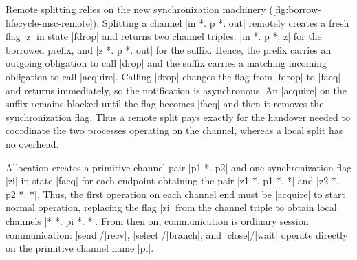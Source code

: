 Remote splitting relies on the new synchronization machinery
(\cref{fig:borrow-lifecycle-msc-remote}). Splitting a channel
|in *. p *. out| remotely creates a fresh flag |z| in state |fdrop| and returns two
channel triples: |in *. p *. z| for the borrowed prefix, and |z *. p *. out| for
the suffix. Hence, the prefix carries an outgoing obligation to call |drop| and
the suffix carries a matching incoming obligation to call |acquire|. Calling
|drop| changes the flag from |fdrop| to |facq| and returns immediately, so the
notification is asynchronous. An |acquire| on the suffix remains blocked until
the flag becomes |facq| and then it removes the synchronization flag. Thus a remote
split pays exactly for the handover needed to coordinate the two
processes operating on the channel, whereas a local split has no overhead.



Allocation creates a primitive
channel pair |p1 *. p2| and one synchronization flag |zi| in state |facq| for each endpoint
obtaining the pair |z1 *. p1 *. *| and |z2 *. p2 *. *|.
Thus, the first operation on each channel end must be |acquire| to start normal
operation, replacing the flag |zi| from the channel 
triple to obtain local channels |* *. pi *. *|. From then on,
communication is ordinary session communication: |send|/|recv|,
|select|/|branch|, and |close|/|wait| operate directly on the primitive
channel name |pi|.


%

